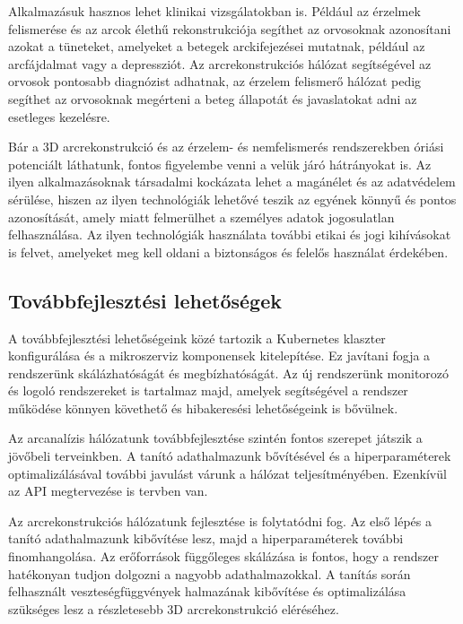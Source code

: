 \documentclass[12pt,a4]{article}
\begin{document}
        Alkalmazásuk hasznos lehet klinikai vizsgálatokban is.
        Például az érzelmek felismerése és az arcok élethű rekonstrukciója segíthet az orvosoknak azonosítani azokat a tüneteket, amelyeket a betegek arckifejezései mutatnak, például az arcfájdalmat vagy a depressziót. Az arcrekonstrukciós hálózat segítségével az orvosok pontosabb diagnózist adhatnak, az érzelem felismerő hálózat pedig segíthet az orvosoknak megérteni a beteg állapotát és javaslatokat adni az esetleges kezelésre.

        Bár a 3D arcrekonstrukció és az érzelem- és nemfelismerés rendszerekben óriási potenciált láthatunk, fontos figyelembe venni a velük járó hátrányokat is. Az ilyen alkalmazásoknak társadalmi kockázata lehet a magánélet és az adatvédelem sérülése, hiszen az ilyen technológiák lehetővé teszik az egyének könnyű és pontos azonosítását, amely miatt felmerülhet a személyes adatok jogosulatlan felhasználása. Az ilyen technológiák használata további etikai és jogi kihívásokat is felvet, amelyeket meg kell oldani a biztonságos és felelős használat érdekében.
            
        \subsection{Továbbfejlesztési lehetőségek}

        A továbbfejlesztési lehetőségeink közé tartozik a Kubernetes klaszter konfigurálása és a mikroszerviz komponensek kitelepítése. Ez javítani fogja a rendszerünk skálázhatóságát és megbízhatóságát. Az új rendszerünk monitorozó és logoló rendszereket is tartalmaz majd, amelyek segítségével a rendszer működése könnyen követhető és hibakeresési lehetőségeink is bővülnek.

        Az arcanalízis hálózatunk továbbfejlesztése szintén fontos szerepet játszik a jövőbeli terveinkben. A tanító adathalmazunk bővítésével és a hiperparaméterek optimalizálásával további javulást várunk a hálózat teljesítményében. Ezenkívül az API megtervezése is tervben van.

        Az arcrekonstrukciós hálózatunk fejlesztése is folytatódni fog. Az első lépés a tanító adathalmazunk kibővítése lesz, majd a hiperparaméterek további finomhangolása. Az erőforrások függőleges skálázása is fontos, hogy a rendszer hatékonyan tudjon dolgozni a nagyobb adathalmazokkal. A tanítás során felhasznált veszteségfüggvények halmazának kibővítése és optimalizálása szükséges lesz a részletesebb 3D arcrekonstrukció eléréséhez.
\end{document}
